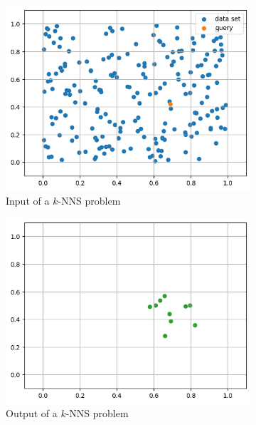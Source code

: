 \begin{figure}[ht]
    \centering
    \hfill
    \begin{subfigure}{0.32\textwidth}
        \includegraphics[width=\textwidth]{images/sim-search-init.png}
        \caption{Input of a \(k\)-NNS problem}
    \end{subfigure}
    \hfill
    \begin{subfigure}{0.32\textwidth}
        \includegraphics[width=\textwidth]{images/sim-search-knn.png}
        \caption{Output of a \(k\)-NNS problem}
    \end{subfigure}
    \hfill
    \begin{subfigure}{0.32\textwidth}

\end{subfigure}
\end{figure}
